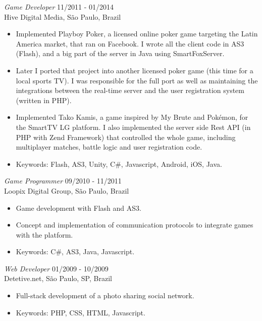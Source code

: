\documentclass[line,margin]{res}
\begin{document}
\begin{resume}
        {\sl Game Developer} \hfill 11/2011 - 01/2014 \\
                Hive Digital Media, São Paulo, Brazil
        \begin{itemize}  \itemsep 1.25pt
            \item Implemented Playboy Poker, a licensed online poker game targeting the Latin America market, that ran on Facebook. I wrote all the client code in AS3 (Flash), and a big part of the server in Java using SmartFoxServer.
            \item Later I ported that project into another licensed poker game (this time for a local sports TV). I was responsible for the full port as well as maintaining the integrations between the real-time server and the user registration system (written in PHP).
            \item Implemented Tako Kamis, a game inspired by My Brute and Pokémon, for the SmartTV LG platform. I also implemented the server side Rest API (in PHP with Zend Framework) that controlled the whole game, including multiplayer matches, battle logic and user registration code.
            \item Keywords: Flash, AS3, Unity, C\#, Javascript, Android, iOS, Java.
        \end{itemize}
                 
        {\sl Game Programmer} \hfill 09/2010 - 11/2011 \\
                Loopix Digital Group, São Paulo, Brazil
        \begin{itemize}  \itemsep 1.25pt
                \item Game development with Flash and AS3.
                \item Concept and implementation of communication protocols to integrate games with the platform. 
                \item Keywords: C\#, AS3, Java, Javascript.
        \end{itemize}
 
        {\sl Web Developer} \hfill 01/2009 - 10/2009 \\
                Detetive.net, São Paulo, SP, Brazil
        \begin{itemize}  \itemsep 1.25pt
                \item Full-stack development of a photo sharing social network.
                \item Keywords: PHP, CSS, HTML, Javascript.
        \end{itemize} 


\end{resume}
\end{document}
